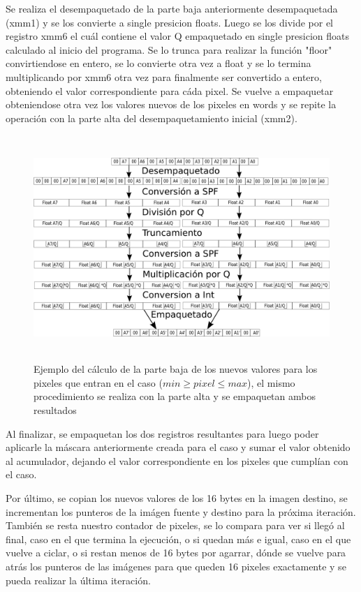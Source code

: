 Se realiza el desempaquetado de la parte baja anteriormente desempaquetada (xmm1) y se los convierte a single presicion floats. Luego se los divide por el registro xmm6 el cuál contiene el valor Q empaquetado en single presicion floats calculado al inicio del programa. Se lo trunca para realizar la función "floor" convirtiendose en entero, se lo convierte otra vez a float y se lo termina multiplicando por xmm6 otra vez para finalmente ser convertido a entero, obteniendo el valor correspondiente para cáda pixel. Se vuelve a empaquetar obteniendose otra vez los valores nuevos de los pixeles en words y se repite la operación con la parte alta del desempaquetamiento inicial (xmm2).

\begin{figure}[H]
\centering
\includegraphics[width=150mm, height=85mm]{calcq.png}
\caption{Ejemplo del cálculo de la parte baja de los nuevos valores para los pixeles que entran en el caso ($min \geq pixel \leq max$), el mismo procedimiento se realiza con la parte alta y se empaquetan ambos resultados}
\label{overflow}
\end{figure}

Al finalizar, se empaquetan los dos registros resultantes para luego poder aplicarle la máscara anteriormente creada para el caso y sumar el valor obtenido al acumulador, dejando el valor correspondiente en los pixeles que cumplían con el caso.

Por último, se copian los nuevos valores de los 16 bytes en la imagen destino, se incrementan los punteros de la imágen fuente y destino para la próxima iteración. También se resta nuestro contador de pixeles, se lo compara para ver si llegó al final, caso en el que termina la ejecución, o si quedan más e igual, caso en el que vuelve a ciclar, o si restan menos de 16 bytes por agarrar, dónde se vuelve para atrás los punteros de las imágenes para que queden 16 pixeles exactamente y se pueda realizar la última iteración.

